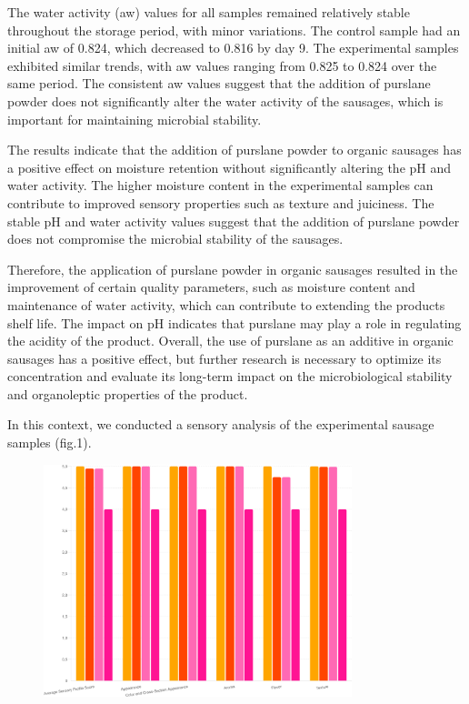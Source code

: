 The water activity (aw) values for all samples remained relatively
stable throughout the storage period, with minor variations. The control
sample had an initial aw of 0.824, which decreased to 0.816 by day 9.
The experimental samples exhibited similar trends, with aw values
ranging from 0.825 to 0.824 over the same period. The consistent aw
values suggest that the addition of purslane powder does not
significantly alter the water activity of the sausages, which is
important for maintaining microbial stability.

The results indicate that the addition of purslane powder to organic
sausages has a positive effect on moisture retention without
significantly altering the pH and water activity. The higher moisture
content in the experimental samples can contribute to improved sensory
properties such as texture and juiciness. The stable pH and water
activity values suggest that the addition of purslane powder does not
compromise the microbial stability of the sausages.

Therefore, the application of purslane powder in organic sausages
resulted in the improvement of certain quality parameters, such as
moisture content and maintenance of water activity, which can contribute
to extending the product\textquotesingle s shelf life. The impact on pH
indicates that purslane may play a role in regulating the acidity of the
product. Overall, the use of purslane as an additive in organic sausages
has a positive effect, but further research is necessary to optimize its
concentration and evaluate its long-term impact on the microbiological
stability and organoleptic properties of the product.

In this context, we conducted a sensory analysis of the experimental
sausage samples (fig.1).

\begin{figure}[H]
	\centering
	\includegraphics[width=0.8\textwidth]{assets/306}
	\caption*{}
\end{figure}

